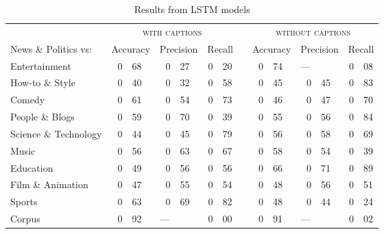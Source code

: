 \documentclass[letterpaper, 12pt]{article}
\begin{document}
\begin{table}[H]
  \centering
  \caption*{Results from LSTM models}
  \begin{tabular}{lr@{.}lr@{.}lr@{.}lp{1em}r@{.}lr@{.}lr@{.}l}
    \toprule
    & \multicolumn{6}{c}{\textsc{with captions}} & & \multicolumn{6}{c}{\textsc{without captions}} \\
    \cmidrule{2-7} \cmidrule{9-14}
    News \& Politics vs: & \multicolumn{2}{r}{Accuracy} & \multicolumn{2}{r}{Precision} & \multicolumn{2}{r}{Recall} & & \multicolumn{2}{r}{Accuracy} & \multicolumn{2}{r}{Precision} & \multicolumn{2}{r}{Recall} \\
    \midrule
    Entertainment         & 0 & 68  & 0 & 27                  & 0 & 20 & & 0 & 74 &	\multicolumn{2}{l}{---}	& 0 & 08 \\
    How-to \& Style       & 0 & 40  & 0 & 32                  & 0 &	58 & & 0 & 45	& 0 & 45                	& 0 & 83 \\
    Comedy                & 0 & 61  &	0 & 54                  &	0 & 73 & & 0 & 46	& 0 & 47                  &	0 & 70 \\
    People \& Blogs       & 0 & 59  &	0 & 70                  &	0 & 39 & & 0 & 55	& 0 & 56                  &	0 & 84 \\
    Science \& Technology & 0 & 44	& 0 & 45                  &	0 & 79 & & 0 & 56	& 0 & 58                  &	0 & 69 \\
    Music                 & 0 & 56  & 0 & 63                  &	0 & 67 & & 0 & 58	& 0 & 54                  &	0 & 39 \\
    Education             & 0 & 49  & 0 & 56                  &	0 & 56 & & 0 & 66	& 0 & 71                  &	0 & 89 \\
    Film \& Animation     & 0 & 47  &	0 & 55                  &	0 & 54 & & 0 & 48	& 0 & 56                  &	0 & 51 \\
    Sports                & 0 & 63  &	0 & 69                  &	0 & 82 & & 0 & 48 &	0 & 44                  &	0 & 24 \\
    \bottomrule
    Corpus                & 0 & 92  & \multicolumn{2}{l}{---} & 0 & 00 & & 0 & 91 &	\multicolumn{2}{l}{---}	& 0 & 02 \\
  \end{tabular}
\end{table}
\end{document}
